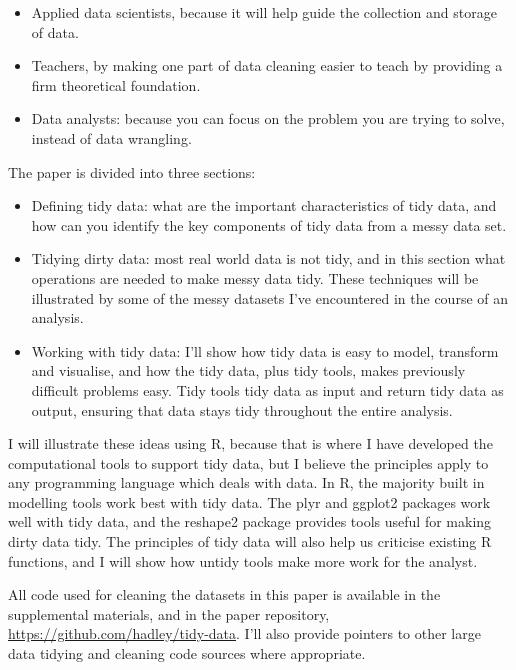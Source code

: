\documentclass[oneside]{article}
\begin{document}
\begin{itemize}

\item Applied data scientists, because it will help guide the collection and storage of data.

\item Teachers, by making one part of data cleaning easier to teach by providing a firm theoretical foundation.

\item Data analysts: because you can focus on the problem you are trying to solve, instead of data wrangling.

\end{itemize}

The paper is divided into three sections:

\begin{itemize}

\item Defining tidy data: what are the important characteristics of tidy data, and how can you identify the key components of tidy data from a messy data set.

\item Tidying dirty data: most real world data is not tidy, and in this section what operations are needed to make messy data tidy. These techniques will be illustrated by some of the messy datasets I've encountered in the course of an analysis.

\item Working with tidy data: I'll show how tidy data is easy to model, transform and visualise, and how the tidy data, plus tidy tools, makes previously difficult problems easy. Tidy tools tidy data as input and return tidy data as output, ensuring that data stays tidy throughout the entire analysis.

\end{itemize}

I will illustrate these ideas using R, because that is where I have developed the computational tools to support tidy data, but I believe the principles apply to any programming language which deals with data. In R, the majority built in modelling tools work best with tidy data. The plyr and ggplot2 \citep{me:ggplot2} packages work well with tidy data, and the reshape2 package provides tools useful for making dirty data tidy. The principles of tidy data will also help us criticise existing R functions, and I will show how untidy tools make more work for the analyst.

All code used for cleaning the datasets in this paper is available in the supplemental materials, and in the paper repository, \url{https://github.com/hadley/tidy-data}.  I'll also provide pointers to other large data tidying and cleaning code sources where appropriate.
\end{document}
